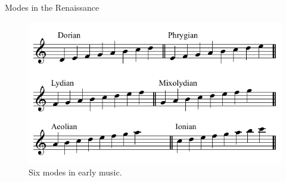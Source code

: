 \begin{frame}{Modes in the Renaissance}
    \begin{figure}
        \centering
        \includegraphics[width=.6\linewidth]{img/renaissance_modes.png}
        \caption{Six modes in early music.}
    \end{figure}
\end{frame}

